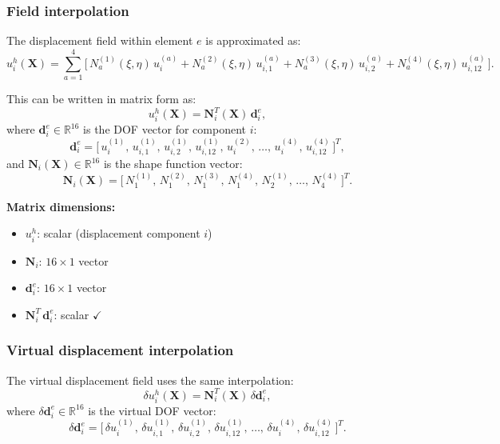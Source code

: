 \documentclass[11pt]{article}
\newcommand{\bX}{\mathbf{X}}
\newcommand{\bX}{\mathbf{X}}
\begin{document}
\subsubsection{Field interpolation}

The displacement field within element $e$ is approximated as:
\begin{equation}
u_{i}^{h}(\bX)
= \sum_{a=1}^{4}\bigl[\,
   N_{a}^{(1)}(\xi,\eta)\,u_{i}^{(a)}
 + N_{a}^{(2)}(\xi,\eta)\,u_{i,1}^{(a)}
 + N_{a}^{(3)}(\xi,\eta)\,u_{i,2}^{(a)}
 + N_{a}^{(4)}(\xi,\eta)\,u_{i,12}^{(a)}
\,\bigr].
\label{s6:u_interp}
\end{equation}

This can be written in matrix form as:
\begin{equation}
\boxed{
u_{i}^{h}(\bX) = \mathbf{N}_{i}^{T}(\bX)\,\mathbf{d}_{i}^{e},
}
\label{s6:u_matrix}
\end{equation}
where $\mathbf{d}_{i}^{e}\in\mathbb{R}^{16}$ is the DOF vector for
component $i$:
\begin{equation}
\mathbf{d}_{i}^{e}
= \bigl[\,
   u_{i}^{(1)},\,u_{i,1}^{(1)},\,u_{i,2}^{(1)},\,u_{i,12}^{(1)},
   \,u_{i}^{(2)},\,\ldots,\,u_{i}^{(4)},\,u_{i,12}^{(4)}
\,\bigr]^{T},
\end{equation}
and $\mathbf{N}_{i}(\bX)\in\mathbb{R}^{16}$ is the shape function vector:
\begin{equation}
\mathbf{N}_{i}(\bX)
= \bigl[\,
   N_{1}^{(1)},\,N_{1}^{(2)},\,N_{1}^{(3)},\,N_{1}^{(4)},
   \,N_{2}^{(1)},\,\ldots,\,N_{4}^{(4)}
\,\bigr]^{T}.
\end{equation}

\textbf{Matrix dimensions:}
\begin{itemize}
\item $u_{i}^{h}$: scalar (displacement component $i$)
\item $\mathbf{N}_{i}$: $16\times 1$ vector
\item $\mathbf{d}_{i}^{e}$: $16\times 1$ vector
\item $\mathbf{N}_{i}^{T}\,\mathbf{d}_{i}^{e}$: scalar $\checkmark$
\end{itemize}

\subsubsection{Virtual displacement interpolation}

The virtual displacement field uses the same interpolation:
\begin{equation}
\delta u_{i}^{h}(\bX) = \mathbf{N}_{i}^{T}(\bX)\,\delta\mathbf{d}_{i}^{e},
\label{s6:delta_u_matrix}
\end{equation}
where $\delta\mathbf{d}_{i}^{e}\in\mathbb{R}^{16}$ is the virtual DOF
vector:
\begin{equation}
\delta\mathbf{d}_{i}^{e}
= \bigl[\,
   \delta u_{i}^{(1)},\,\delta u_{i,1}^{(1)},\,\delta u_{i,2}^{(1)},\,\delta u_{i,12}^{(1)},
   \,\ldots,\,
   \delta u_{i}^{(4)},\,\delta u_{i,12}^{(4)}
\,\bigr]^{T}.
\end{equation}
\end{document}
